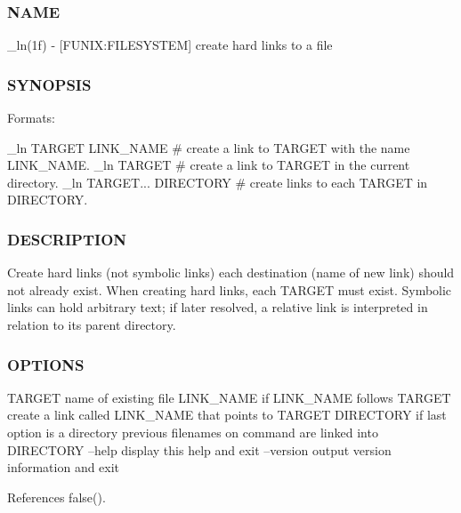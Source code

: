 \subsubsection*{N\+A\+ME}

\+\_\+ln(1f) -\/ \mbox{[}F\+U\+N\+IX\+:F\+I\+L\+E\+S\+Y\+S\+T\+EM\mbox{]} create hard links to a file \subsubsection*{S\+Y\+N\+O\+P\+S\+IS}

Formats\+:

\+\_\+ln T\+A\+R\+G\+ET L\+I\+N\+K\+\_\+\+N\+A\+ME \# create a link to T\+A\+R\+G\+ET with the name L\+I\+N\+K\+\_\+\+N\+A\+ME. \+\_\+ln T\+A\+R\+G\+ET \# create a link to T\+A\+R\+G\+ET in the current directory. \+\_\+ln T\+A\+R\+G\+ET... D\+I\+R\+E\+C\+T\+O\+RY \# create links to each T\+A\+R\+G\+ET in D\+I\+R\+E\+C\+T\+O\+RY. \subsubsection*{D\+E\+S\+C\+R\+I\+P\+T\+I\+ON}

Create hard links (not symbolic links) each destination (name of new link) should not already exist. When creating hard links, each T\+A\+R\+G\+ET must exist. Symbolic links can hold arbitrary text; if later resolved, a relative link is interpreted in relation to its parent directory. \subsubsection*{O\+P\+T\+I\+O\+NS}

T\+A\+R\+G\+ET name of existing file L\+I\+N\+K\+\_\+\+N\+A\+ME if L\+I\+N\+K\+\_\+\+N\+A\+ME follows T\+A\+R\+G\+ET create a link called L\+I\+N\+K\+\_\+\+N\+A\+ME that points to T\+A\+R\+G\+ET D\+I\+R\+E\+C\+T\+O\+RY if last option is a directory previous filenames on command are linked into D\+I\+R\+E\+C\+T\+O\+RY --help display this help and exit --version output version information and exit 

References false().

